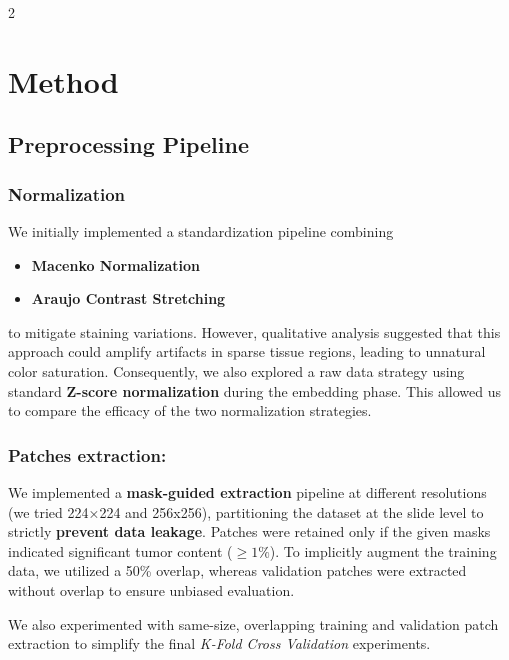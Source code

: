\documentclass[11pt]{article}
\begin{document}
\begin{multicols}{2}
        \section{Method} 
        \vspace{-0.2cm}
        \subsection{Preprocessing Pipeline}
        \vspace{-2mm}
        \subsubsection{Normalization} 
        We initially implemented a standardization pipeline combining 
        \begin{itemize}[noitemsep,topsep=0pt]
            \setlength{\itemsep}{1pt}
            \setlength{\parskip}{0pt}
            \setlength{\parsep}{0pt}
            \item \textbf{Macenko Normalization} \cite{macenko2009method} 
            \item \textbf{Araujo Contrast Stretching} \cite{araujo2017classification}
        \end{itemize}
            to mitigate staining variations. However, qualitative analysis suggested that this approach could amplify artifacts in sparse tissue regions, leading to unnatural color saturation. Consequently, we also explored a raw data strategy using standard \textbf{Z-score normalization} during the embedding phase. This allowed us to compare the efficacy of the two normalization strategies.
        
        \subsubsection{Patches extraction:}
        We implemented a \textbf{mask-guided extraction} pipeline at different resolutions (we tried 224×224 and 256x256), partitioning the dataset at the slide level to strictly \textbf{prevent data leakage}. Patches were retained only if the given masks indicated significant tumor content ($\geq 1\%$). To implicitly augment the training data, we utilized a 50\% overlap, whereas validation patches were extracted without overlap to ensure unbiased evaluation.
        
        We also experimented with same-size, overlapping training and validation patch extraction to simplify the final \textit{K-Fold Cross Validation} experiments.
        \vspace{-6mm}


\end{multicols}
\end{document}
